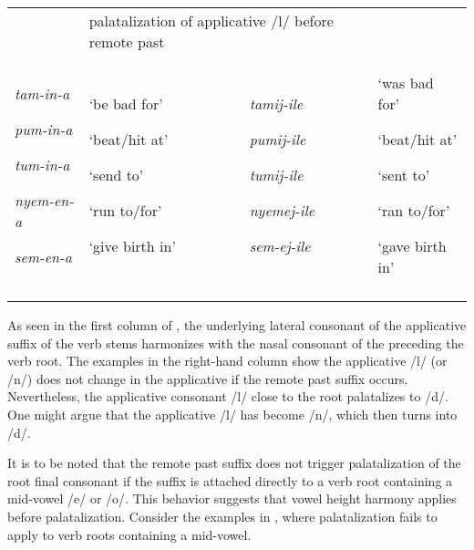 \documentclass[output=paper]{langsci/langscibook}
\begin{document}
\begin{tabular}{llll}
\lsptoprule
\multicolumn{2}{l}{\mdseries Root-applicative-FV } & \multicolumn{2}{l}{\mdseries palatalization of applicative /l/ before remote past}\\
{\mdseries \emph{tam-in-a}}

{\mdseries \emph{pum-in-a}}

{\mdseries \emph{tum-in-a}}

{\mdseries \emph{nyem-en-a}}

\mdseries \emph{sem-en-a} & {\mdseries ‘be bad for’}

{\mdseries ‘beat/hit at’}

{\mdseries ‘send to’}

{\mdseries ‘run to/for’}

\mdseries ‘give birth in’ & {\mdseries \emph{tamij-ile}}

{\mdseries \emph{pumij-ile}}

{\mdseries \emph{tumij-ile}}

{\mdseries \emph{nyemej-ile}}

\mdseries \emph{sem-ej-ile} & {\mdseries ‘was bad for’}

{\mdseries ‘beat/hit at’}

{\mdseries ‘sent to’}

{\mdseries ‘ran to/for’}

\mdseries ‘gave birth in’\\
\lspbottomrule
\end{tabular}
As seen in the first column of , the underlying lateral consonant of the applicative suffix of the verb stems harmonizes with the nasal consonant of the preceding the verb root. The examples in the right-hand column show the applicative /l/ (or /n/) does not change in the applicative if the remote past suffix occurs. Nevertheless, the applicative consonant /l/ close to the root palatalizes to /d/. One might argue that the applicative /l/ has become /n/, which then turns into /d/. 

\begin{styleBodyTextIndent}
It is to be noted that the remote past suffix does not trigger palatalization of the root final consonant if the suffix is attached directly to a verb root containing a mid-vowel /e/ or /o/. This behavior suggests that vowel height harmony applies before palatalization. Consider the examples in , where palatalization fails to apply to verb roots containing a mid-vowel. 
\end{styleBodyTextIndent}
\end{document}
